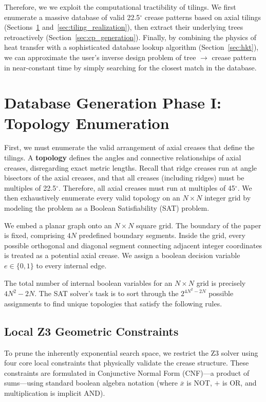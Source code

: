 \documentclass[11pt]{article}
\begin{document}
Therefore, we we exploit the computational tractibility of tilings. We first enumerate a massive database of valid 22.5$^\circ$ crease patterns based on axial tilings (Sections~\ref{sec:topology_enumeration} and~\ref{sec:tiling_realization}), then extract their underlying trees retroactively (Section~\ref{sec:cp_generation}). Finally, by combining the physics of heat transfer with a sophisticated database lookup algorithm (Section~\ref{sec:hkt}), we can approximate the user's inverse design problem of tree $\to$ crease pattern in near-constant time by simply searching for the closest match in the database.


\section{Database Generation Phase I: Topology Enumeration}\label{sec:topology_enumeration}
First, we must enumerate the valid arrangement of axial creases that define the tilings. A \textbf{topology} defines the angles and connective relationships of axial creases, disregarding exact metric lengths. Recall that ridge creases run at angle bisectors of the axial creases, and that all creases (including ridges) must be multiples of 22.5$^\circ$. Therefore, all axial creases must run at multiples of 45$^\circ$. We then exhaustively enumerate every valid topology on an $N \times N$ integer grid by modeling the problem as a Boolean Satisfiability (SAT) problem.

We embed a planar graph onto an $N \times N$ square grid. The boundary of the paper is fixed, comprising $4N$ predefined boundary segments. Inside the grid, every possible orthogonal and diagonal segment connecting adjacent integer coordinates is treated as a potential axial crease. We assign a boolean decision variable $e \in \{0, 1\}$ to every internal edge.

The total number of internal boolean variables for an $N \times N$ grid is precisely $4N^2 - 2N$. The SAT solver's task is to sort through the $2^{4N^2 - 2N}$ possible assignments to find unique topologies that satisfy the following rules. 

\subsection{Local Z3 Geometric Constraints}
To prune the inherently exponential search space, we restrict the Z3 solver using four core local constraints that physically validate the crease structure. These constraints are formulated in Conjunctive Normal Form (CNF)---a product of sums---using standard boolean algebra notation (where $\overline{x}$ is NOT, $+$ is OR, and multiplication is implicit AND).
\end{document}
